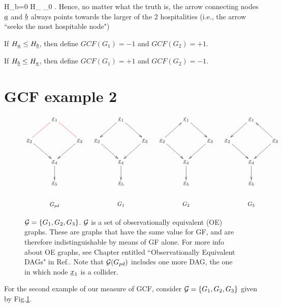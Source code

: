 \documentclass[12pt]{article}
\begin{document}
\beq
H_b=0
H_\rva\geq 
{}_0
\;.
\eeq
Hence, 
no matter what the truth is, the arrow 
connecting nodes ${\underline{a}}$
and ${\underline{b}}$ always points towards
the larger of the 2 hospitalities
(i.e., the arrow ``seeks the most hospitable
node")

If $H_{\underline{a}}\leq  H_{\underline{b}}$, then define
$GCF(G_1)=-1$ and $GCF(G_2)=+1$.

If $H_{\underline{b}}\leq  H_{\underline{a}}$, then define
$GCF(G_1)=+1$ and $GCF(G_2)=-1$.



\section{GCF example 2}

\begin{figure}[h!]
$$
\xymatrix{
&\rvx_1
\ar@[red]@{-}[dl]\ar@[red]@{-}[dr]
\\
\rvx_2\ar[dr]
&&\rvx_3\ar[dl]
\\
&\rvx_4\ar[d]
\\
&\rvx_5
\\
&G_{pd}
}
\;\;\;\;\;
\xymatrix{
&\rvx_1
\ar[dl]
\ar[dr]
\\
\rvx_2\ar[dr]
&&\rvx_3\ar[dl]
\\
&\rvx_4\ar[d]
\\
&\rvx_5
\\
&G_1
}
\;\;\;\;\;
\xymatrix{
&\rvx_1
\ar[dr]
\\
\rvx_2\ar[dr]\ar[ur]
&&\rvx_3\ar[dl]
\\
&\rvx_4\ar[d]
\\
&\rvx_5
\\
&G_2
}
\;\;\;\;\;
\xymatrix{
&\rvx_1
\ar[dl]
\\
\rvx_2\ar[dr]
&&\rvx_3\ar[dl]\ar[ul]
\\
&\rvx_4\ar[d]
\\
&\rvx_5
\\
&G_3
}
$$
\caption{${\cal G}=\{G_1, G_2, G_3\}$.
${\cal G}$ is a set of observationally
equivalent (OE) graphs. 
These are graphs that have the
same value for GF, and
are therefore indistinguishable
by means of GF alone. For more info about 
OE graphs, see Chapter
entitled ``Observationally Equivalent DAGs"
in Ref.\cite{bayesuvius}.
Note that ${\cal G}(G_{pd})$
includes one more DAG,
the one in which node ${\underline{x}}_1$
is a collider.}
\label{fig-ob-eq-2}
\end{figure}

For the second example of
our measure of GCF,
consider 
${\cal G}=\{G_1, G_2, G_3\}$
given by Fig.\ref{fig-ob-eq-2}.
\end{document}
